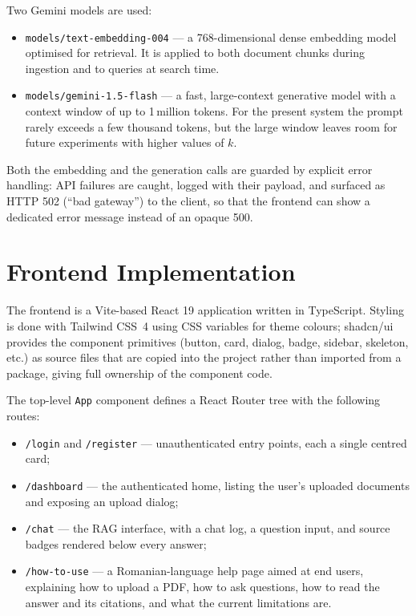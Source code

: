 Two Gemini models are used:

\begin{itemize}
  \item \texttt{models/text-embedding-004} --- a 768-dimensional dense
        embedding model optimised for retrieval. It is applied to both
        document chunks during ingestion and to queries at search time.
  \item \texttt{models/gemini-1.5-flash} --- a fast, large-context
        generative model with a context window of up to 1\,million
        tokens. For the present system the prompt rarely exceeds a few
        thousand tokens, but the large window leaves room for future
        experiments with higher values of $k$.
\end{itemize}

Both the embedding and the generation calls are guarded by explicit
error handling: API failures are caught, logged with their payload, and
surfaced as HTTP 502 (``bad gateway'') to the client, so that the
frontend can show a dedicated error message instead of an opaque 500.

\section{Frontend Implementation}
\label{sec:frontend-impl}

The frontend is a Vite-based React 19 application written in TypeScript.
Styling is done with Tailwind CSS~4 using CSS variables for theme
colours; shadcn/ui provides the component primitives (button, card,
dialog, badge, sidebar, skeleton, etc.) as source files that are copied
into the project rather than imported from a package, giving full
ownership of the component code.

The top-level \texttt{App} component defines a React Router tree with
the following routes:

\begin{itemize}
  \item \texttt{/login} and \texttt{/register} --- unauthenticated
        entry points, each a single centred card;
  \item \texttt{/dashboard} --- the authenticated home, listing the
        user's uploaded documents and exposing an upload dialog;
  \item \texttt{/chat} --- the RAG interface, with a chat log, a
        question input, and source badges rendered below every answer;
  \item \texttt{/how-to-use} --- a Romanian-language help page aimed
        at end users, explaining how to upload a PDF, how to ask
        questions, how to read the answer and its citations, and what
        the current limitations are.
\end{itemize}

